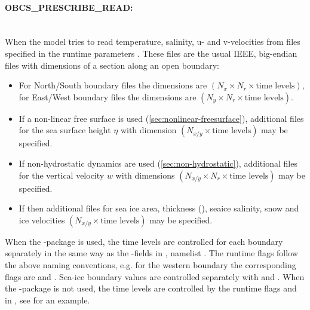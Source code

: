 \paragraph{OBCS\_PRESCRIBE\_READ:} ~ \\
%
When  the model tries to read
temperature, salinity, u- and v-velocities from files specified in the
runtime parameters . These files are
the usual IEEE, big-endian files with dimensions of a section along an
open boundary:
\begin{itemize}
\item For North/South boundary files the dimensions are
  $(N_x\times N_r\times\mbox{time levels})$, for East/West boundary
  files the dimensions are $(N_y\times N_r\times\mbox{time levels})$.
\item If a non-linear free surface is used
  (\ref{sec:nonlinear-freesurface}), additional files
   for the sea surface height $\eta$ with
  dimension $(N_{x/y}\times\mbox{time levels})$ may be specified.
\item If non-hydrostatic dynamics are used
  (\ref{sec:non-hydrostatic}), additional files
   for the vertical velocity $w$ with
  dimensions $(N_{x/y}\times N_r\times\mbox{time levels})$ may be
  specified.
\item If  then additional files
   for sea ice area, thickness
  (), seaice salinity, snow and ice velocities
  $(N_{x/y}\times\mbox{time levels})$ may be specified.
\end{itemize}
When the -package is used, the time levels are controlled
for each boundary separately in the same way as the -fields
in , namelist . The runtime flags
follow the above naming conventions, e.g. for the western boundary the
corresponding flags are  and
. Sea-ice boundary values are controlled separately
with  and .
When the -package is not used, the time levels are
controlled by the runtime flags  and
 in , see 
for an example.

